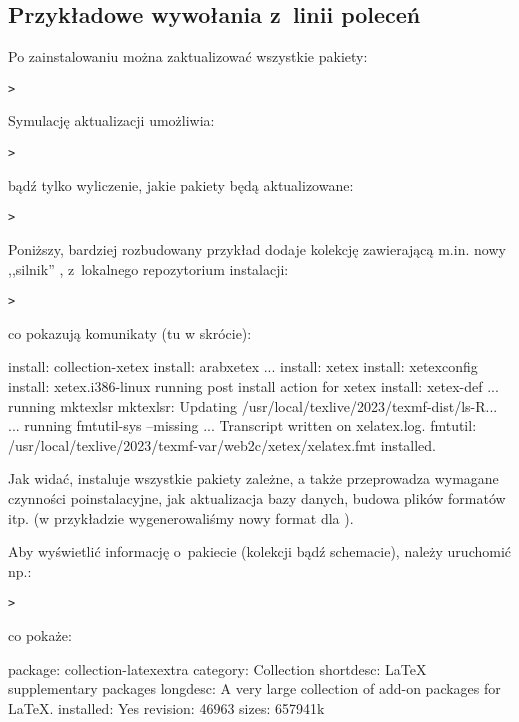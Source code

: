 \documentclass{article}
\begin{document}
\subsection{Przykładowe wywołania  z~linii poleceń}

Po zainstalowaniu \TL{} można zaktualizować wszystkie pakiety:
\begin{alltt}
> 
\end{alltt}
Symulację aktualizacji umożliwia:
\begin{alltt}
> 
\end{alltt}
bądź tylko wyliczenie, jakie pakiety będą aktualizowane:
\begin{alltt}
> 
\end{alltt}

Poniższy, bardziej rozbudowany przykład dodaje kolekcję zawierającą m.in. nowy ,,silnik'' \XeTeX,
 z~lokalnego repozytorium instalacji:

\begin{alltt}
> 
\end{alltt}
co pokazują komunikaty (tu w skrócie):
\begin{fverbatim}
install: collection-xetex
install: arabxetex
...
install: xetex
install: xetexconfig
install: xetex.i386-linux
running post install action for xetex
install: xetex-def
...
running mktexlsr
mktexlsr: Updating /usr/local/texlive/2023/texmf-dist/ls-R...
...
running fmtutil-sys --missing
...
Transcript written on xelatex.log.
fmtutil: /usr/local/texlive/2023/texmf-var/web2c/xetex/xelatex.fmt installed.
\end{fverbatim}

Jak widać,  instaluje wszystkie pakiety zależne, a także
przeprowadza wymagane czynności poinstalacyjne, jak aktualizacja bazy
danych, budowa plików formatów itp. (w przykładzie wygenerowaliśmy
nowy format dla \XeTeX).

Aby wyświetlić informację o~pakiecie (kolekcji bądź schemacie), należy
uruchomić np.:
\begin{alltt}
> 
\end{alltt}
co pokaże:
\begin{fverbatim}
package:    collection-latexextra
category:   Collection
shortdesc:  LaTeX supplementary packages
longdesc:   A very large collection of add-on packages for LaTeX.
installed:  Yes
revision:   46963
sizes:      657941k
\end{fverbatim}
\end{document}
